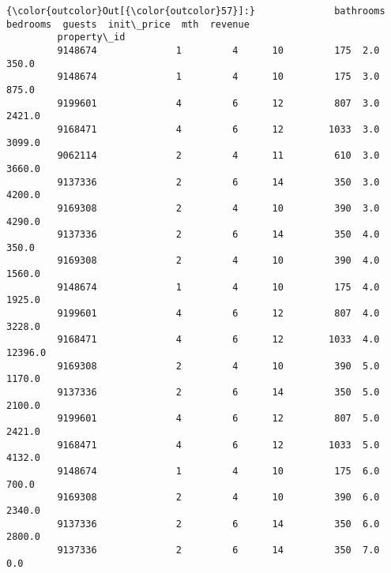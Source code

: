 \documentclass[11pt]{article}
\begin{document}
\begin{Verbatim}[commandchars=\\\{\}]
{\color{outcolor}Out[{\color{outcolor}57}]:}              bathrooms  bedrooms  guests  init\_price  mth  revenue
         property\_id                                                       
         9148674              1         4      10         175  2.0    350.0
         9148674              1         4      10         175  3.0    875.0
         9199601              4         6      12         807  3.0   2421.0
         9168471              4         6      12        1033  3.0   3099.0
         9062114              2         4      11         610  3.0   3660.0
         9137336              2         6      14         350  3.0   4200.0
         9169308              2         4      10         390  3.0   4290.0
         9137336              2         6      14         350  4.0    350.0
         9169308              2         4      10         390  4.0   1560.0
         9148674              1         4      10         175  4.0   1925.0
         9199601              4         6      12         807  4.0   3228.0
         9168471              4         6      12        1033  4.0  12396.0
         9169308              2         4      10         390  5.0   1170.0
         9137336              2         6      14         350  5.0   2100.0
         9199601              4         6      12         807  5.0   2421.0
         9168471              4         6      12        1033  5.0   4132.0
         9148674              1         4      10         175  6.0    700.0
         9169308              2         4      10         390  6.0   2340.0
         9137336              2         6      14         350  6.0   2800.0
         9137336              2         6      14         350  7.0      0.0
\end{Verbatim}
            
\end{document}
